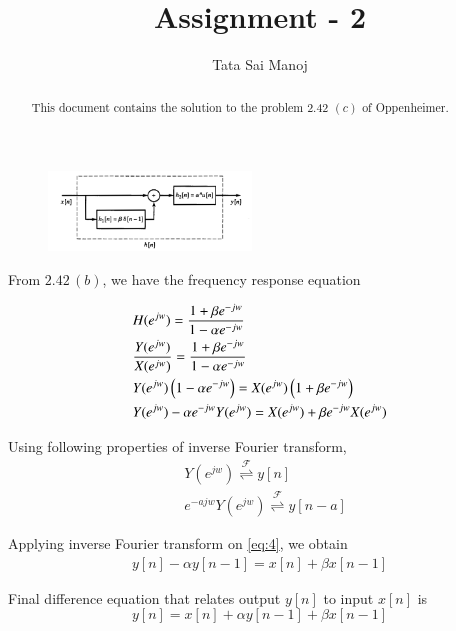 \documentclass[journal,12pt,twocolumn]{IEEEtran}
\begin{document}
\title{Assignment - 2}
\author{Tata Sai Manoj}
\maketitle

\bigskip 
\begin{abstract}
    This document contains the solution to the problem 2.42 $(c)$ of Oppenheimer.
\end{abstract}

\begin{figure}[!ht]
    \centering
    \includegraphics[width=0.48\textwidth]{figs/question.png}
\end{figure}

\solution
From $2.42 \, (b)$, we have the frequency response equation

\begin{align}
	&H(e^{jw}) = \frac{1 + \beta e^{-jw}}{1 - \alpha e^{-jw}} \\
	&\frac{Y(e^{jw})}{X(e^{jw})} = \frac{1 + \beta e^{-jw}}{1 - \alpha e^{-jw}} \\
	&Y(e^{jw}) \left(1 - \alpha e^{-jw}\right) = X(e^{jw}) \left(1 + \beta e^{-jw}\right) \\
	&Y(e^{jw}) - \alpha e^{-jw} Y(e^{jw}) = X(e^{jw}) + \beta e^{-jw} X(e^{jw})
	\label{eq:4}
\end{align}

Using following properties of inverse Fourier transform, 
\begin{align}
	&Y(e^{jw}) \stackrel{\mathcal{F}}{\rightleftharpoons} y[n] \\
	&e^{-ajw} Y(e^{jw}) \stackrel{\mathcal{F}}{\rightleftharpoons} y[n-a] 
\end{align}

Applying inverse Fourier transform on \eqref{eq:4}, we obtain
\begin{align}
	y[n] - \alpha y[n-1] = x[n] + \beta x[n-1]
\end{align}

Final difference equation that relates output $y[n]$ to input $x[n]$ is 
\begin{equation}
    y[n]  = x[n] + \alpha y[n-1] + \beta x[n-1]
\end{equation}
\end{document}
